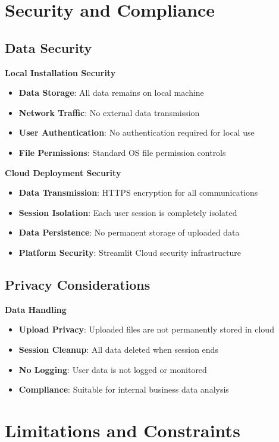 \section{Security and Compliance}

\subsection{Data Security}

\textbf{Local Installation Security}
\begin{itemize}
	\item \textbf{Data Storage}: All data remains on local machine
	\item \textbf{Network Traffic}: No external data transmission
	\item \textbf{User Authentication}: No authentication required for local use
	\item \textbf{File Permissions}: Standard OS file permission controls
\end{itemize}

\textbf{Cloud Deployment Security}
\begin{itemize}
	\item \textbf{Data Transmission}: HTTPS encryption for all communications
	\item \textbf{Session Isolation}: Each user session is completely isolated
	\item \textbf{Data Persistence}: No permanent storage of uploaded data
	\item \textbf{Platform Security}: Streamlit Cloud security infrastructure
\end{itemize}

\subsection{Privacy Considerations}

\textbf{Data Handling}
\begin{itemize}
	\item \textbf{Upload Privacy}: Uploaded files are not permanently stored in cloud
	\item \textbf{Session Cleanup}: All data deleted when session ends
	\item \textbf{No Logging}: User data is not logged or monitored
	\item \textbf{Compliance}: Suitable for internal business data analysis
\end{itemize}

\section{Limitations and Constraints}

